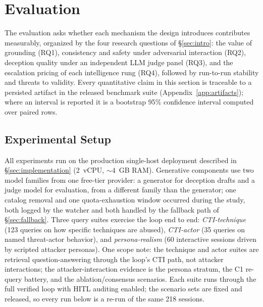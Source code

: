 \section{Evaluation}
\label{sec:evaluation}



The evaluation asks whether each mechanism the design introduces
contributes measurably, organized by the four research questions of
\S\ref{sec:intro}: the value of grounding (RQ1), consistency and safety
under adversarial interaction (RQ2), deception quality under an
independent LLM judge panel (RQ3), and the escalation pricing of each
intelligence rung (RQ4), followed by run-to-run stability and threats to
validity. Every quantitative claim in this section is traceable to a
persisted artifact in the released benchmark suite (Appendix~\ref{app:artifacts});
where an interval is reported it is a bootstrap 95\% confidence interval
computed over paired rows.

\subsection{Experimental Setup}
\label{sec:setup}

All experiments run on the production single-host deployment described in
\S\ref{sec:implementation} (2~vCPU, ${\sim}4$~GB RAM). Generative
components use two model families from one free-tier provider: a generator
for deception drafts and a judge model for evaluation, from a different
family than the generator; one catalog removal and one quota-exhaustion
window occurred during the study, both logged by the watcher and both
handled by the fallback path of \S\ref{sec:fallback}. Three query suites
exercise the loop end to end: \emph{CTI-technique} (123 queries on how
specific \attck techniques are abused), \emph{CTI-actor} (35 queries on
named threat-actor behavior), and \emph{persona-realism} (60 interactive
sessions driven by scripted attacker personas). One scope note: the
technique and actor suites are retrieval question-answering through the
loop's CTI path, not attacker interactions; the attacker-interaction
evidence is the persona stratum, the C1 re-query battery, and the
ablation/consensus scenarios. Each suite runs through the full verified
loop with HITL auditing enabled; the scenario sets are fixed and released,
so every run below is a re-run of the same 218 sessions.

